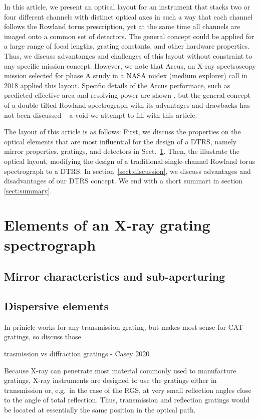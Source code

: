 \documentclass[linenumbers]{aastex631}
\begin{document}
{In this article, we present an optical layout for an instrument that stacks two or four different channels with distinct optical axes in such a way that each channel follows the Rowland torus prescription, yet at the same time all channels are imaged onto a common set of detectors. The general concept could be applied for a large range of focal lengths, grating constants, and other hardware properties. Thus, we discuss advantanges and challenges of this layout without constraint to any specific mission concept. However, we note that Arcus\cite{}, an X-ray spectroscopy mission selected for phase A study in a NASA midex (medium explorer) call in 2018 applied this layout. Specific details of the  Arcus performace, such as predicted effective area and resolving power are shown \citenum{}, but the general concept of a double tilted Rowland spectrograph with its advantages and drawbacks has not been discussed -- a void we attempt to fill with this article.

The layout of this article is as follows: First, we discuss the properties on the optical elements that are most influential for the design of a DTRS, namely mirror properties, gratings, and detectors in Sect.~\ref{sect:elements}. Then, the illustrate the optical layout, modifying the design of a traditional single-channel Rowland torus spectrograph to a DTRS. In section~\ref{sect:discussion}, we discuss advantages and disadvantages of our DTRS concept. We end with a short summart in section \ref{sect:summary}.

\section{Elements of an X-ray grating spectrograph}
\label{sect:elements}

\subsection{Mirror characteristics and sub-aperturing}

\subsection{Dispersive elements}
In prinicle works for any transmission grating, but makes most sense for CAT gratings, so discuss those

trasmission vs diffraction gratings - Casey 2020

Because X-ray can penetrate most material commonly used to manufacture gratings, X-ray instruments are designed to use the gratings either in transmission or, e.g.\ in the case of the RGS, at very small reflection angles close to the angle of total reflection. Thus, transmission and reflection gratings would be located at essentially the same position in the optical path.


}
\end{document}
